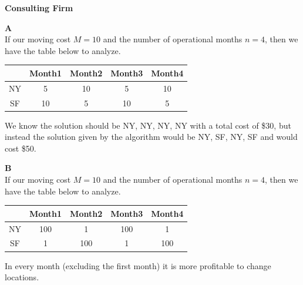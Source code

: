 \documentclass[11pt]{article}
\begin{document}
	

\medskip


\lineacross


\begin{solution} \textbf{Consulting Firm} \\

	\hfil
	
	\textbf{A}\\
	
	
	If our moving cost $M = 10$ and the number of operational months $n = 4$, then we have the table below to analyze.
		
		
	\begin{center}
		\begin{tabular}{ | c | c | c | c | c |}
			 \hline  
			 & Month1 & Month2 & Month3 & Month4 \\
			\hline
 			NY & 5 & 10 	& 5 & 10\\ 
 			\hline
 			SF & 10 & 5 & 10 & 5\\  
 			\hline  
		\end{tabular}
	\end{center}
	
	We know the solution should be NY, NY, NY, NY with a total cost of \$30, but instead the solution given by the algorithm would be NY, SF, NY, SF and would cost \$50.
	
	\hfil
	
	 
	\textbf{B}\\
	
	
	If our moving cost $M = 10$ and the number of operational months $n = 4$, then we have the table below to analyze.
		
		
	\begin{center}
		\begin{tabular}{ | c | c | c | c | c |}
			 \hline  
			 & Month1 & Month2 & Month3 & Month4 \\
			\hline
 			NY & 100 & 1 & 100 & 1\\ 
 			\hline
 			SF & 1 & 100 & 1 & 100\\  
 			\hline  
		\end{tabular}
	\end{center}
	
	In every month (excluding the first month) it is more profitable to change locations. 
	

\end{solution}
\end{document}
